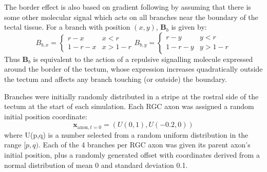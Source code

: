\documentclass[11pt, a4paper]{article}
\begin{document}
The border effect is also based on gradient following by assuming that
there is some other molecular signal which acts on all branches near the
boundary of the tectal tissue. For a branch with position $(x,y)$, $\mathbf{B}_b$ is
given by:
%
\begin{equation}
B_{b,x} = \begin{cases}
        r-x      & x<r \\
        1-r-x    & x>1-r
\end{cases}
B_{b,y} = \begin{cases}
        r-y      & y<r \\
        1-r-y    & y>1-r
\end{cases}
\end{equation}
%
Thus $\mathbf{B}_b$ is equivalent to the action of a repulsive signalling
molecule expressed around the border of the tectum, whose expression increases
quadratically outside the tectum and affects any branch touching (or outside)
the boundary.

Branches were initially randomly distributed in a stripe at the rostral side
of the tectum at the start of each simulation. Each RGC axon was assigned a
random initial position coordinate:
\begin{equation}
\mathbf{x}_{\text{axon},t=0} = (U(0,1), U(-0.2,0))
\end{equation}
where U(p,q) is a number selected from a random uniform distribution in the
range $[p,q)$. Each of the 4 branches per RGC axon was given its parent
axon's initial position, plus a randomly generated offset with coordinates
derived from a normal distribution of mean 0 and standard deviation 0.1.
\end{document}
